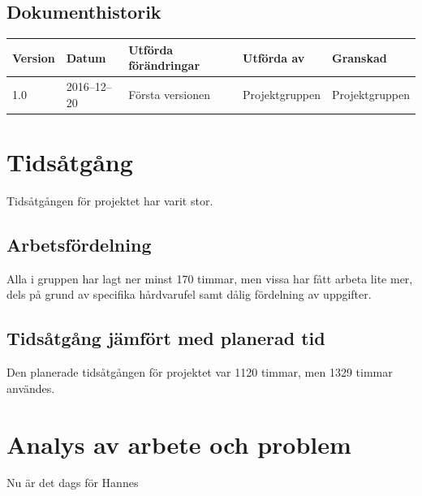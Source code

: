 \documentclass[a4paper,titlepage,12pt]{article}
\begin{document}
\begin{center}
		
		
		\section*{Dokumenthistorik}
		\renewcommand*{\arraystretch}{1.4}
		\begin{longtable}[c]{ l l >{\raggedright}p{5cm} >{\raggedright}p{3cm} l }
			\textbf{Version} & \textbf{Datum} & \textbf{Utförda förändringar} 
			& \textbf{Utförda av} & \textbf{Granskad} \\ \midrule
			
			1.0 & 2016--12--20 & Första versionen & Projektgruppen &
			Projektgruppen \\
			
		\end{longtable}
	\end{center}
	
	
	\newpage
	
	\raggedright
	
	\section{Tidsåtgång}
    Tidsåtgången för projektet har varit stor.
	
	\subsection{Arbetsfördelning}
    Alla i gruppen har lagt ner minst 170 timmar, men vissa har fått arbeta
    lite mer, dels på grund av specifika hårdvarufel samt dålig fördelning av
    uppgifter.
	
	\subsection{Tidsåtgång jämfört med planerad tid}
    Den planerade tidsåtgången för projektet var 1120 timmar, men 1329 timmar
    användes.
	
	\section{Analys av arbete och problem}
	Nu är det dags för Hannes
	
\end{document}
